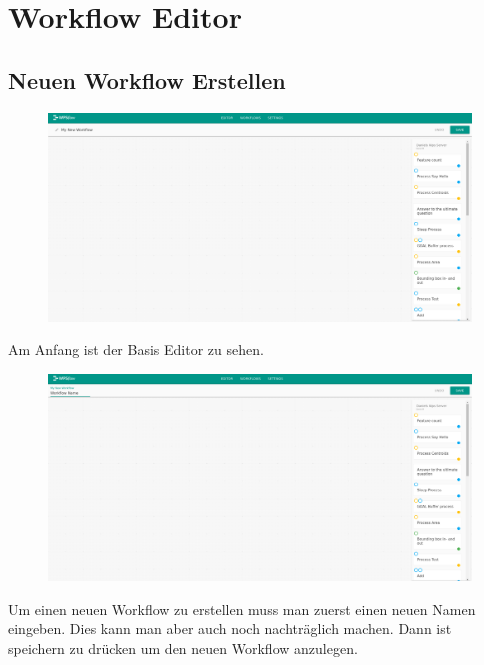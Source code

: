\chapter{Workflow Editor}
\section{Neuen Workflow Erstellen}
    \begin{figure}[H]
        \centering
        \includegraphics[width=15.5cm]{images/BaseEditor.png}
        \label{base_editor}
    \end{figure}
    Am Anfang ist der Basis Editor zu sehen. 
    \begin{figure}[H]
        \centering
        \includegraphics[width=15.5cm]{images/New Workflow.png}
        \label{new_workflow}
    \end{figure}
    Um einen neuen Workflow zu erstellen muss man zuerst einen neuen Namen eingeben. Dies kann man aber auch noch nachträglich machen. Dann ist speichern zu drücken um den neuen Workflow anzulegen. 
    
